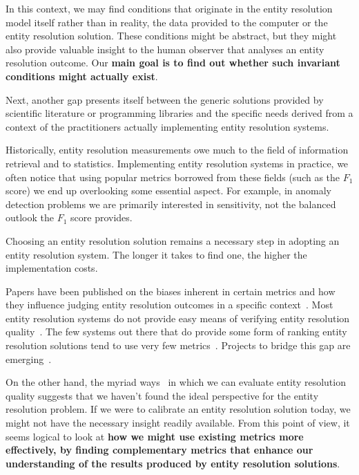 In this context, we may find conditions that originate in the entity resolution
model itself rather than in reality, the data provided to the computer or the
entity resolution solution.
These conditions might be abstract, but they might also provide valuable
insight to the human observer that analyses an entity resolution outcome.
Our \textbf{main goal is to find out whether such invariant conditions might
actually exist}.

Next, another gap presents itself between the generic solutions provided by
scientific literature or programming libraries and the specific needs derived
from a context of the practitioners actually implementing entity resolution
systems.

Historically, entity resolution measurements owe much to the field of
information retrieval and to statistics.
Implementing entity resolution systems in practice, we often notice that
using popular metrics borrowed from these fields (such as the $F_1$ score) we
end up overlooking some essential aspect.
For example, in anomaly detection problems we are primarily interested in
sensitivity, not the balanced outlook the $F_1$ score provides.

Choosing an entity resolution solution remains a necessary step in adopting an
entity resolution system.
The longer it takes to find one, the higher the implementation costs.

Papers have been published on the biases inherent in certain metrics
and how they influence judging entity resolution outcomes in a specific
context~\cite{Goga2015}.
Most entity resolution systems do not provide easy means of verifying entity
resolution quality~\cite{fever2009,oyster2012,jedai2017,magellan2020}.
The few systems out there that do provide some form of ranking entity
resolution solutions tend to use very few metrics~\cite{papwithcode2019}.
Projects to bridge this gap are emerging~\cite{matchescu-er-metrics2023}.

On the other hand, the myriad ways~\cite{hitesh2012} in which we can evaluate
entity resolution quality suggests that we haven't found the ideal perspective
for the entity resolution problem.
If we were to calibrate an entity resolution solution today, we might not have 
the necessary insight readily available.
From this point of view, it seems logical to look at \textbf{how we might use
existing metrics more effectively, by finding complementary metrics that enhance
our understanding of the results produced by entity resolution solutions}.


